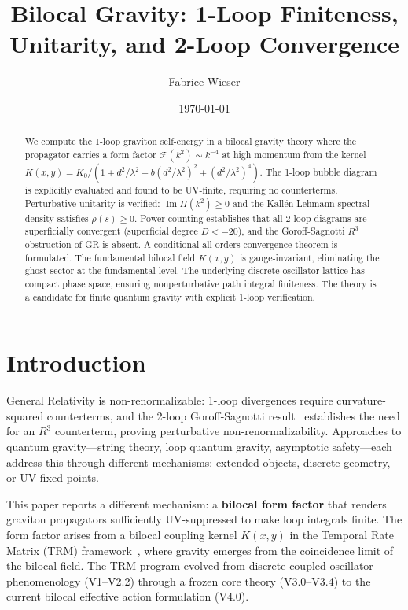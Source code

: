 \documentclass[aps,prd,reprint,nofootinbib]{revtex4-2}
\begin{document}
\title{Bilocal Gravity: 1-Loop Finiteness, Unitarity, and 2-Loop Convergence}

\author{Fabrice Wieser}

\date{\today}

\begin{abstract}
We compute the 1-loop graviton self-energy in a bilocal gravity theory where the propagator carries a form factor $\mathcal{F}(k^2) \sim k^{-4}$ at high momentum from the kernel $K(x,y) = K_0/(1+d^2/\lambda^2+b(d^2/\lambda^2)^2+(d^2/\lambda^2)^4)$. The 1-loop bubble diagram is explicitly evaluated and found to be UV-finite, requiring no counterterms. Perturbative unitarity is verified: $\operatorname{Im}\Pi(k^2)\geq 0$ and the K\"all\'en-Lehmann spectral density satisfies $\rho(s)\geq 0$. Power counting establishes that all 2-loop diagrams are superficially convergent (superficial degree $D<-20$), and the Goroff-Sagnotti $R^3$ obstruction of GR is absent. A conditional all-orders convergence theorem is formulated. The fundamental bilocal field $K(x,y)$ is gauge-invariant, eliminating the ghost sector at the fundamental level. The underlying discrete oscillator lattice has compact phase space, ensuring nonperturbative path integral finiteness. The theory is a candidate for finite quantum gravity with explicit 1-loop verification.
\end{abstract}

\maketitle

\section{Introduction}
\label{sec:intro}

General Relativity is non-renormalizable: 1-loop divergences require curvature-squared counterterms, and the 2-loop Goroff-Sagnotti result~\cite{GoroffSagnotti1986} establishes the need for an $R^3$ counterterm, proving perturbative non-renormalizability. Approaches to quantum gravity---string theory, loop quantum gravity, asymptotic safety---each address this through different mechanisms: extended objects, discrete geometry, or UV fixed points.

This paper reports a different mechanism: a \textbf{bilocal form factor} that renders graviton propagators sufficiently UV-suppressed to make loop integrals finite. The form factor arises from a bilocal coupling kernel $K(x,y)$ in the Temporal Rate Matrix (TRM) framework~\cite{TRM_V4_Paper, TRM_G6_Final}, where gravity emerges from the coincidence limit of the bilocal field. The TRM program evolved from discrete coupled-oscillator phenomenology (V1--V2.2) through a frozen core theory (V3.0--V3.4) to the current bilocal effective action formulation (V4.0).
\end{document}
